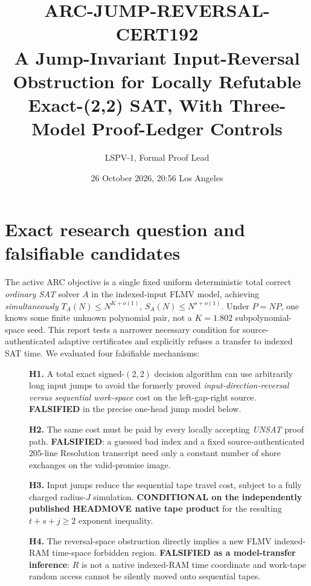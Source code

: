 \documentclass[11pt]{article}
\title{ARC-JUMP-REVERSAL-CERT192\\\large A Jump-Invariant Input-Reversal Obstruction for Locally Refutable Exact-(2,2) SAT, With Three-Model Proof-Ledger Controls}
\author{LSPV-1, Formal Proof Lead}
\date{26 October 2026, 20:56 Los Angeles}
\begin{document}
\maketitle
\begin{center}
\end{center}

\section{Exact research question and falsifiable candidates}
The active ARC objective is a single fixed uniform deterministic total correct \emph{ordinary SAT} solver $A$ in the indexed-input FLMV model, achieving \emph{simultaneously} $T_A(N)\le N^{K+o(1)}$, $S_A(N)\le N^{s+o(1)}$. Under $P=NP$, one knows some finite unknown polynomial pair, not a $K=1.802$ subpolynomial-space seed. This report tests a narrower necessary condition for source-authenticated adaptive certificates and explicitly refuses a transfer to indexed SAT time. We evaluated four falsifiable mechanisms:
\begin{description}
\item[] \textbf{H1.} A total exact signed-$(2,2)$ decision algorithm can use arbitrarily long input jumps to avoid the formerly proved \emph{input-direction-reversal versus sequential work-space} cost on the left-gap-right source. \textbf{FALSIFIED} in the precise one-head jump model below.
\item[] \textbf{H2.} The same cost must be paid by every locally accepting \emph{UNSAT} proof path. \textbf{FALSIFIED}: a guessed bad index and a fixed source-authenticated $205$-line Resolution transcript need only a constant number of shore exchanges on the valid-promise image.
\item[] \textbf{H3.} Input jumps reduce the sequential tape travel cost, subject to a fully charged radius-$J$ simulation. \textbf{CONDITIONAL on the independently published HEADMOVE native tape product} for the resulting $t+s+j\ge2$ exponent inequality.
\item[] \textbf{H4.} The reversal-space obstruction directly implies a new FLMV indexed-RAM time-space forbidden region. \textbf{FALSIFIED as a model-transfer inference}: $R$ is not a native indexed-RAM time coordinate and work-tape random access cannot be silently moved onto sequential tapes.
\end{description}
\end{document}
